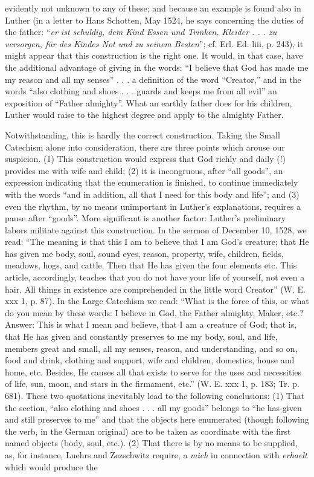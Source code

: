 evidently not unknown to any of these; and because an example is found also in Luther (in a letter to Hans Schotten, May 1524, he says concerning the duties of the father: “\emph{er ist schuldig, dem Kind Essen und Trinken, Kleider . . . zu versorgen, für des Kindes Not und zu seinem Besten}”; cf. Erl. Ed. liii, p. 243),
it might appear that this construction is the right one. It would, in that case, have the additional advantage of giving in the words: “I believe that God has made me my reason and all my senses” . . . a definition of the word “Creator,” and in the words “also clothing and shoes . . . guards and keeps me from all evil” an exposition of “Father almighty”. What an earthly father does for his children, Luther would raise to the highest degree and apply to the almighty Father.

Notwithstanding, this is hardly the correct construction. Taking the Small Catechism alone into consideration, there are three points which arouse our suspicion. (1) This construction would express that God richly and daily (!) provides me with wife and child; (2) it is incongruous, after “all goods”, an expression indicating that the enumeration is finished, to continue immediately with the words “and in addition, all that I need for this body and life”; and (3) even the rhythm, by no means unimportant in Luther’s explanations, requires a pause after “goods”. More significant is another factor: Luther’s preliminary labors militate against this construction. In the sermon of December 10, 1528, we read: “The meaning is that this I am to believe that I am God’s creature; that He has given me body, soul, sound eyes, reason, property, wife, children, fields, meadows, hogs, and cattle. Then that He has given the four elements etc. This article, accordingly, teaches that you do not have your life of yourself, not even a hair. All things in existence are comprehended in the little word Creator” (W. E. xxx 1, p. 87). In the Large Catechism we read: “What is the force of this, or what do you mean by these words: I believe in God, the Father almighty, Maker, etc.? Answer: This is what I mean and believe, that I am a creature of God; that is, that He has given and constantly preserves to me my body, soul, and life, members great and small, all my senses, reason, and understanding, and so on, food and drink, clothing and support, wife and children, domestics, house and home, etc. Besides, He causes all that exists to serve for the uses and necessities of life, sun, moon, and stars in the firmament, etc.” (W. E. xxx 1, p. 183; Tr. p. 681). These two quotations inevitably lead to the following conclusions: (1) That the section, “also clothing and shoes . . . all my goods” belongs to “he has given and still preserves to me” and that the objects here enumerated (though following the verb, in the German original) are to be taken as coordinate with the first named objects (body, soul, etc.). (2) That there is by no means to be supplied, as, for instance, Luehrs and Zezschwitz require, a \emph{mich} in connection with \emph{erhaelt} which would produce the

